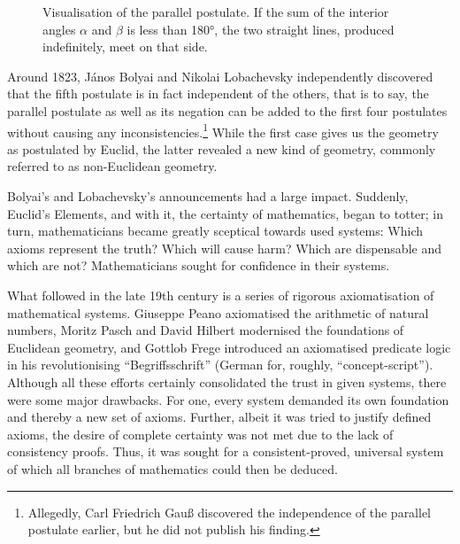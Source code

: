 \documentclass{article}
\begin{document}
\begin{figure}[h]
	\centering
{}
	\caption{Visualisation of the parallel postulate. If the sum of the interior angles $\alpha$ and $\beta$ is less than 180°, the two straight lines, produced indefinitely, meet on that side.}
\end{figure}
Around 1823, János Bolyai and Nikolai Lobachevsky independently discovered that the fifth postulate is in fact independent of the others, that is to say, the parallel postulate as well as its negation can be added to the first four postulates without causing any inconsistencies.\footnote{Allegedly, Carl Friedrich Gauß discovered the independence of the parallel postulate earlier, but he did not publish his finding.} While the first case gives us the geometry as postulated by Euclid, the latter revealed a new kind of geometry, commonly referred to as non-Euclidean geometry. 

Bolyai's and Lobachevsky's announcements had a large impact. Suddenly, Euclid's Elements, and with it, the certainty of mathematics, began to totter; in turn, mathematicians became greatly sceptical towards used systems: Which axioms represent the truth? Which will cause harm? Which are dispensable and which are not? Mathematicians sought for confidence in their systems.

What followed in the late 19th century is a series of rigorous axiomatisation of mathematical systems. Giuseppe Peano axiomatised the arithmetic of natural numbers, Moritz Pasch and David Hilbert modernised the foundations of Euclidean geometry, and Gottlob Frege introduced an axiomatised predicate logic in his revolutionising ``Begriffsschrift'' (German for, roughly, ``concept-script''). Although all these efforts certainly consolidated the trust in given systems, there were some major drawbacks. For one, every system demanded its own foundation and thereby a new set of axioms. Further, albeit it was tried to justify defined axioms, the desire of complete certainty was not met due to the lack of consistency proofs. Thus, it was sought for a consistent-proved, universal system of which all branches of mathematics could then be deduced.
\end{document}
